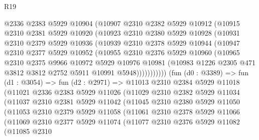 \begin{lexlean}{R19}
\begin{coremodule}
            @2336
            @2383
            @5929
            @10904
            (@10907
              @2310
              @2382
              @5929
              @10912
              (@10915
                @2310
                @2381
                @5929
                @10920
                (@10923
                  @2310
                  @2380
                  @5929
                  @10928
                  (@10931
                    @2310
                    @2379
                    @5929
                    @10936
                    (@10939
                      @2310
                      @2378
                      @5929
                      @10944
                      (@10947
                        @2310
                        @2377
                        @5929
                        @10952
                        (@10955
                          @2310
                          @2376
                          @5929
                          @10960
                          (@10965
                            @2310
                            @2375
                            @9966
                            @10972
                            @5929
                            @10976
                            @10981
                            (@10983 @1226 @2305 @471 @3812 @3812 @2752 @5911 @10991 @5948)))))))))))
        (fun (d0 : @3389) =>
        fun (d1 : @3054) =>
        fun (d2 : @2971) =>
        @11013
          @2310
          @2384
          @5929
          @11018
          (@11021
            @2336
            @2383
            @5929
            @11026
            (@11029
              @2310
              @2382
              @5929
              @11034
              (@11037
                @2310
                @2381
                @5929
                @11042
                (@11045
                  @2310
                  @2380
                  @5929
                  @11050
                  (@11053
                    @2310
                    @2379
                    @5929
                    @11058
                    (@11061
                      @2310
                      @2378
                      @5929
                      @11066
                      (@11069
                        @2310
                        @2377
                        @5929
                        @11074
                        (@11077
                          @2310
                          @2376
                          @5929
                          @11082
                          (@11085
                            @2310

\end{coremodule}
\end{lexlean}
